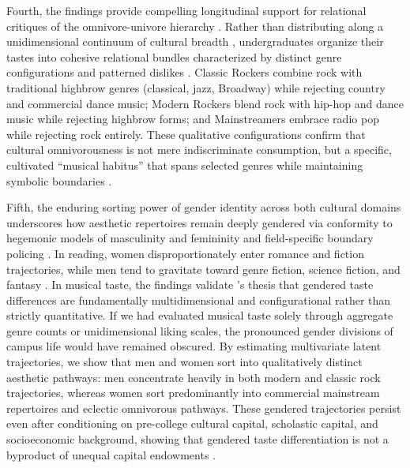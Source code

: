 \documentclass[12pt]{article}
\begin{document}
Fourth, the findings provide compelling longitudinal support for relational critiques of the omnivore-univore hierarchy \citep{rimmer2012beyond,goldberg2011mapping-77a}. Rather than distributing along a unidimensional continuum of cultural breadth \citep{peterson1996changing-967,warde2008omnivorous-e77,sullivan2007omnivore-018,vries2022what-1a2}, undergraduates organize their tastes into cohesive relational bundles characterized by distinct genre configurations and patterned dislikes \citep{bryson1996anything-311,bryson1997what-933,sonnett2004musical-961,sonnett2016ambivalence-352}. Classic Rockers combine rock with traditional highbrow genres (classical, jazz, Broadway) while rejecting country and commercial dance music; Modern Rockers blend rock with hip-hop and dance music while rejecting highbrow forms; and Mainstreamers embrace radio pop while rejecting rock entirely. These qualitative configurations confirm that cultural omnivorousness is not mere indiscriminate consumption, but a specific, cultivated ``musical habitus'' that spans selected genres while maintaining symbolic boundaries \citep{rimmer2012beyond,goldberg2016what-4e3}.

Fifth, the enduring sorting power of gender identity across both cultural domains underscores how aesthetic repertoires remain deeply gendered via conformity to hegemonic models of masculinity and femininity and field-specific boundary policing \citep{lagaert2017engendering,schmutz2016cultural,nous2021multidimensional}. In reading, women disproportionately enter romance and fiction trajectories, while men tend to gravitate toward genre fiction, science fiction, and fantasy \citep{kraaykamp2003literary}. In musical taste, the findings validate \citet{ma2026deep}'s thesis that gendered taste differences are fundamentally multidimensional and configurational rather than strictly quantitative. If we had evaluated musical taste solely through aggregate genre counts or unidimensional liking scales, the pronounced gender divisions of campus life would have remained obscured. By estimating multivariate latent trajectories, we show that men and women sort into qualitatively distinct aesthetic pathways: men concentrate heavily in both modern and classic rock trajectories, whereas women sort predominantly into commercial mainstream repertoires and eclectic omnivorous pathways. These gendered trajectories persist even after conditioning on pre-college cultural capital, scholastic capital, and socioeconomic background, showing that gendered taste differentiation is not a byproduct of unequal capital endowments \citep{ma2026deep}.
\end{document}
